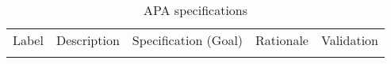 \begin{footnotesize}
\begin{longtable}{p{}p{}p{}p{}p{}}
\caption{APA specifications } \\
  \rowcolor{dunesky}
       Label & Description  & Specification \newline (Goal) & Rationale & Validation \\  \colhline















\label{tab:specs:SP-APA}
\end{longtable}
\end{footnotesize}